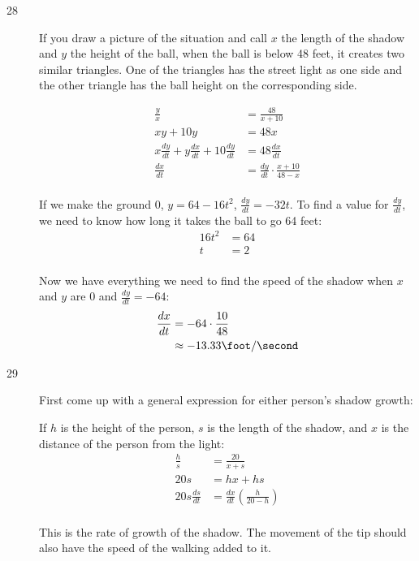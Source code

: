 \documentclass[fleqn]{exam}
\begin{document}
\begin{description}
\pagebreak

\item[28]
If you draw a picture of the situation and call $x$ the length of the shadow and $y$ the height of the ball, when the
ball is below 48 feet, it creates two similar triangles.  One of the triangles has the street light as one side and the
other triangle has the ball height on the corresponding side.

\begin{align*}
  \frac{y}{x} &= \frac{48}{x + 10} \\
  xy + 10y &= 48x \\
  x \frac{dy}{dt} + y \frac{dx}{dt} + 10 \frac{dy}{dt} &= 48 \frac{dx}{dt} \\
  \frac{dx}{dt} &= \frac{dy}{dt} \cdot \frac{x + 10}{48 - x} \\
\end{align*}

If we make the ground 0, $y = 64 - 16t^2$, $\frac{dy}{dt} = -32t$.  To find a value for $\frac{dy}{dt}$, we need to know how long it takes the
ball to go 64 feet:
\begin{align*}
  16t^2 &= 64 \\
  t &= 2 \\
\end{align*}

Now we have everything we need to find the speed of the shadow when $x$ and $y$ are 0 and $\frac{dy}{dt} = -64$:
\begin{align*}
  \frac{dx}{dt} &= -64 \cdot \frac{10}{48} \\
  &\approx - 13.33 \foot / \second \\
\end{align*}

\pagebreak

\item[29]
First come up with a general expression for either person's shadow growth:

If $h$ is the height of the person, $s$ is the length of the shadow, and $x$ is the distance of the person from the light:
\begin{align*}
  \frac{h}{s} &= \frac{20}{x + s} \\
  20s &= hx + hs \\
  20s \frac{ds}{dt} &= \frac{dx}{dt} \left( \frac{h}{20 - h} \right) \\
\end{align*}

This is the rate of growth of the shadow.  The movement of the tip should also have the speed of the walking added to
it.


\end{description}
\end{document}
